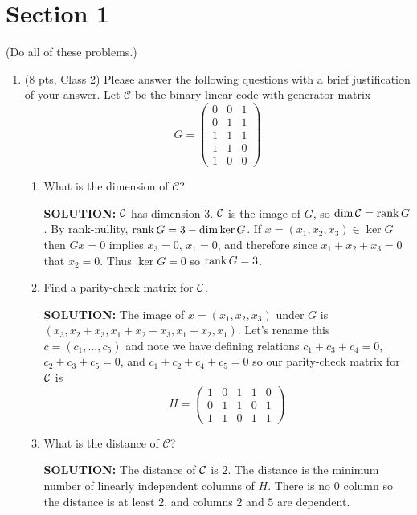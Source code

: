 \documentclass{article}
\newcommand{\cC}{\mathcal{C}}
\begin{document}
\section*{Section 1}
\setcounter{section}{1}
(Do all of these problems.)
\begin{enumerate}

\item (8 pts, Class 2) Please answer the following questions with a brief justification of your answer. Let $\cC$ be the binary linear code with generator matrix
\[ G = \begin{pmatrix} 0 & 0 & 1 \\ 0& 1& 1 \\ 1 & 1 & 1 \\ 1 & 1 & 0 \\ 1 & 0 & 0 \end{pmatrix} \]
\begin{enumerate}
	\item What is the dimension of $\cC$?

\begin{shaded}
\textbf{SOLUTION:}
$\mathcal{C}$ has dimension $3$. $\mathcal{C}$ is the image of $G$, so $\dim \mathcal{C} = \operatorname{rank} G$. By rank-nullity, $\operatorname{rank} G = 3 - \dim \ker G$. If $x = (x_1,x_2,x_3) \in \ker G$ then $Gx = 0$ implies $x_3 = 0$, $x_1 = 0$, and therefore since $x_1 + x_2 + x_3 = 0$ that $x_2 = 0$. Thus $\ker G = 0$ so $\operatorname{rank} G = 3$.
\end{shaded}

	\item Find a parity-check matrix for $\mathcal{C}$.

\begin{shaded}
\textbf{SOLUTION:}
The image of $x = (x_1, x_2, x_3)$ under $G$ is $(x_3, x_2 + x_3, x_1 + x_2 + x_3, x_1 + x_2, x_1)$. Let's rename this $c = (c_1, \ldots, c_5)$ and note we have defining relations $c_1 + c_3 + c_4 = 0$, $c_2 + c_3 +  c_5 = 0$, and $c_1 + c_2 + c_4 + c_5 = 0$ so our parity-check matrix for $\mathcal{C}$ is
\[H = \begin{pmatrix}
    1 & 0 & 1 & 1 & 0 \\
    0 & 1 & 1 & 0 & 1 \\
    1 & 1 & 0 & 1 & 1
\end{pmatrix}\]
\end{shaded}

	\item What is the distance of $\cC$?

\begin{shaded}
\textbf{SOLUTION:}
The distance of $\mathcal{C}$ is $2$. The distance is the minimum number of linearly independent columns of $H$. There is no $0$ column so the distance is at least $2$, and columns $2$ and $5$ are dependent.
\end{shaded}


\end{enumerate}
\end{enumerate}
\end{document}
